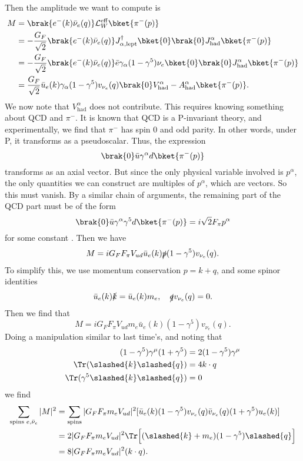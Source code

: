 \documentclass[a4paper]{article}
\begin{document}
Then the amplitude we want to compute is
\begin{align*}
  M &= \brak{e^-(k) \bar{\nu}_e (q)} \mathcal{L}_W^{\mathrm{eff}} \bket{\pi^-(p)}\\
  &= - \frac{G_F}{\sqrt{2}} \brak{e^-(k) \bar{\nu}_e(q)} J_{\alpha, \mathrm{lept}}^\dagger \bket{0} \brak{0} J_{\mathrm{had}}^\alpha \bket{\pi^-(p)}\\
  &= - \frac{G_F}{\sqrt{2}} \brak{e^-(k) \bar{\nu}_e(q)} \bar{e} \gamma_\alpha (1 - \gamma^5) \nu_e \bket{0} \brak{0} J_{\mathrm{had}}^\alpha \bket{\pi^-(p)}\\
  &= \frac{G_F}{\sqrt{2}} \bar{u}_e (k) \gamma_\alpha(1 - \gamma^5) v_{\nu_e}(q) \brak{0} V_{\mathrm{had}}^\alpha - A_{\mathrm{had}}^\alpha \bket{\pi^-(p)}.
\end{align*}
We now note that $V_{\mathrm{had}}^\alpha$ does not contribute. This requires knowing something about QCD and $\pi^-$. It is known that QCD is a P-invariant theory, and experimentally, we find that $\pi^-$ has spin $0$ and odd parity. In other words, under P, it transforms as a pseudoscalar. Thus, the expression
\[
  \brak{0}\bar{u} \gamma^\alpha d \bket{\pi^-(p)}
\]
transforms as an axial vector. But since the only physical variable involved is $p^\alpha$, the only quantities we can construct are multiples of $p^\alpha$, which are vectors. So this must vanish. By a similar chain of arguments, the remaining part of the QCD part must be of the form
\[
  \brak{0} \bar{u} \gamma^\alpha \gamma^5 d \bket{\pi^-(p)} = i \sqrt{2} F_\pi p^\alpha
\]
for some constant . Then we have
\[
  M = i G_F F_\pi V_{ud} \bar{u}_e(k) \slashed p (1 - \gamma^5) v_{\nu_e}(q).
\]
To simplify this, we use momentum conservation $p = k + q$, and some spinor identities
\[
  \bar{u}_e(k) \slashed{k} = \bar{u}_e(k) m_e,\quad \slashed{q} v_{\nu_e}(q) = 0.
\]
Then we find that
\[
  M = i G_F F_\pi V_{ud} m_e \bar{u}_e(k) (1 - \gamma^5) v_{\nu_e}(q).
\]
Doing a manipulation similar to last time's, and noting that
\begin{align*}
  (1 - \gamma^5) \gamma^\mu(1 + \gamma^5) &= 2(1 - \gamma^5) \gamma^\mu\\
  \Tr (\slashed{k}\slashed{q}) &= 4 k\cdot q\\
  \Tr (\gamma^5 \slashed{k}\slashed{q}) &= 0
\end{align*}
we find
\begin{align*}
  \sum_{\text{spins }e, \bar{\nu}_e} |M|^2 &= \sum_{\mathrm{spins}} |G_F F_\pi m_e V_{ud}|^2 [\bar{u}_e(k) (1 - \gamma^5) v_{\nu_e}(q) \bar{v}_{\nu_e}(q) (1 + \gamma^5) u_e(k)]\\
  &= 2|G_F F_\pi m_e V_{ud}|^2 \Tr \Big[(\slashed{k} + m_e)( 1 - \gamma^5) \slashed{q}\Big]\\
  &= 8 |G_F F_\pi m_e V_{ud}|^2 (k \cdot q).
\end{align*}
\end{document}
